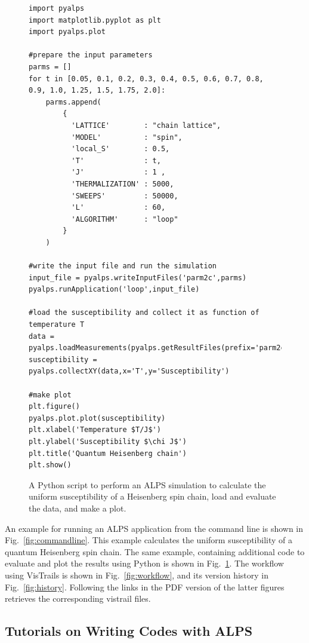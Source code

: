 \documentclass[12pt]{iopart}
\begin{document}
\begin{figure}
\begin{tiny}
\begin{center}
\begin{verbatim}
import pyalps
import matplotlib.pyplot as plt
import pyalps.plot

#prepare the input parameters
parms = []
for t in [0.05, 0.1, 0.2, 0.3, 0.4, 0.5, 0.6, 0.7, 0.8, 0.9, 1.0, 1.25, 1.5, 1.75, 2.0]:
    parms.append(
        { 
          'LATTICE'        : "chain lattice", 
          'MODEL'          : "spin",
          'local_S'        : 0.5,
          'T'              : t,
          'J'              : 1 ,
          'THERMALIZATION' : 5000,
          'SWEEPS'         : 50000,
          'L'              : 60,
          'ALGORITHM'      : "loop"
        }
    )

#write the input file and run the simulation
input_file = pyalps.writeInputFiles('parm2c',parms)
pyalps.runApplication('loop',input_file)

#load the susceptibility and collect it as function of temperature T
data = pyalps.loadMeasurements(pyalps.getResultFiles(prefix='parm2c'),'Susceptibility')
susceptibility = pyalps.collectXY(data,x='T',y='Susceptibility')

#make plot
plt.figure()
pyalps.plot.plot(susceptibility)
plt.xlabel('Temperature $T/J$')
plt.ylabel('Susceptibility $\chi J$')
plt.title('Quantum Heisenberg chain')
plt.show()
\end{verbatim}
\end{center}
\end{tiny}
\caption{A Python script to perform an ALPS simulation to calculate the uniform susceptibility of a Heisenberg spin chain, load and evaluate the data, and make a plot. }
\label{fig:python}
\end{figure}

An example for running an ALPS application from the command line is shown in Fig.~\ref{fig:commandline}. This example calculates the uniform susceptibility of a quantum Heisenberg spin chain. The same example, containing additional code to evaluate and plot the results  using Python is shown in Fig.~\ref{fig:python}. The workflow using VisTrails is shown in Fig.~\ref{fig:workflow}, and its version history in Fig.~\ref{fig:history}. Following the links in the PDF version of the latter figures retrieves the corresponding vistrail files.

\subsection{Tutorials on Writing Codes with ALPS}
\end{document}
